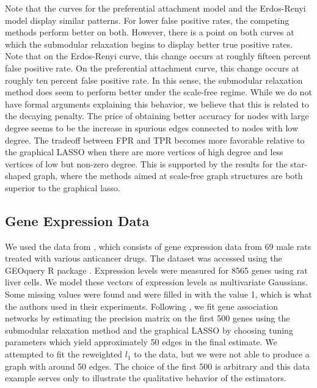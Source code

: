 \documentclass{uwstat572}
\theoremstyle{remark}
\theoremstyle{definition}
\begin{document}
Note that the curves for the preferential attachment model and the Erdos-Renyi model display similar patterns.  For lower false positive rates, the competing methods perform better on both.  However, there is a point on both curves at which the submodular relaxation begins to display better true positive rates.  Note that on the Erdos-Renyi curve, this change occurs at roughly fifteen percent false positive rate.  On the preferential attachment curve, this change occurs at roughly ten percent false positive rate.  In this sense, the submodular relaxation method does seem to perform better under the scale-free regime.  While we do not have formal arguments explaining this behavior, we believe that this is related to the decaying penalty.  The price of obtaining better accuracy for nodes with large degree seems to be the increase in spurious edges connected to nodes with low degree.  The tradeoff between FPR and TPR becomes more favorable relative to the graphical LASSO when there are more vertices of high degree and less vertices of low but non-zero degree.  This is supported by the results for the star-shaped graph, where the methods aimed at scale-free graph structures are both superior to the graphical lasso.  





\subsection{Gene Expression Data}

We used the data from \cite{ganter05}, which consists of gene expression data from 69 male rats treated with various anticancer drugs.  The dataset was accessed using the GEOquery R package \citep{geoquery}.  Expression levels were measured for 8565 genes using rat liver cells.  We model these vectors of expression levels as multivariate Gaussians.  Some missing values were found and were filled in with the value 1, which is what the authors used in their experiments.  Following \cite{Defazio2012}, we fit gene association networks by estimating the precision matrix on the first 500 genes using the submodular relaxation method and the graphical LASSO by choosing tuning parameters which yield approximately 50 edges in the final estimate. We attempted to fit the reweighted $l_1$ to the data, but we were not able to produce a graph with around 50 edges.   The choice of the first 500 is arbitrary and this data example serves only to illustrate the qualitative behavior of the estimators.  
\end{document}

